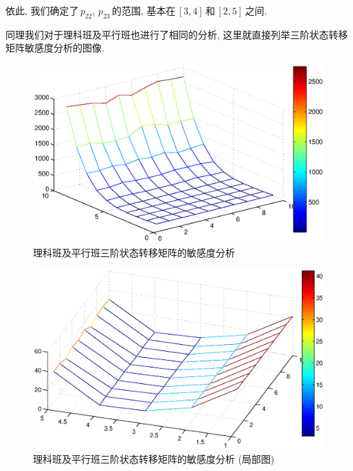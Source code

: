 \documentclass[a4paper]{article}
\begin{document}
  依此, 我们确定了\,$p_{22}$, $p_{23}$\,的范围, 基本在\,$[3,4]$\,和\,$[2,5]$\,之间.\par
  同理我们对于理科班及平行班也进行了相同的分析, 这里就直接列举三阶状态转移矩阵敏感度分析的图像.
  \begin{figure}[H]
  \centerline{\includegraphics[scale=0.7]{norm3.eps}}
  \caption{理科班及平行班三阶状态转移矩阵的敏感度分析}
  \end{figure}
  \begin{figure}[H]
  \centerline{\includegraphics[scale=0.7]{norm3part.eps}}
  \caption{理科班及平行班三阶状态转移矩阵的敏感度分析 (局部图)}
  \end{figure}
 \clearpage
\end{document}
